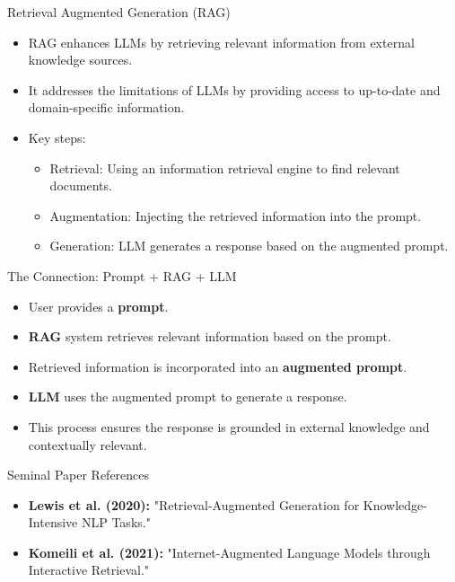 \begin{frame}{Retrieval Augmented Generation (RAG)}
  \begin{itemize}
    \item RAG enhances LLMs by retrieving relevant information from external knowledge sources.
    \item It addresses the limitations of LLMs by providing access to up-to-date and domain-specific information.
    \item Key steps:
      \begin{itemize}
        \item Retrieval: Using an information retrieval engine to find relevant documents.
        \item Augmentation: Injecting the retrieved information into the prompt.
        \item Generation: LLM generates a response based on the augmented prompt.
      \end{itemize}
  \end{itemize}
\end{frame}

\begin{frame}{The Connection: Prompt + RAG + LLM}
  \begin{itemize}
    \item User provides a \textbf{prompt}.
    \item \textbf{RAG} system retrieves relevant information based on the prompt.
    \item Retrieved information is incorporated into an \textbf{augmented prompt}.
    \item \textbf{LLM} uses the augmented prompt to generate a response.
    \item This process ensures the response is grounded in external knowledge and contextually relevant.
  \end{itemize}
\end{frame}

\begin{frame}{Seminal Paper References}
  \begin{itemize}
    \item \textbf{Lewis et al. (2020):} "Retrieval-Augmented Generation for Knowledge-Intensive NLP Tasks." \cite{lewis2020retrieval}
    \item \textbf{Komeili et al. (2021):} "Internet-Augmented Language Models through Interactive Retrieval." \cite{komeili2021internet}
  \end{itemize}
\end{frame}

